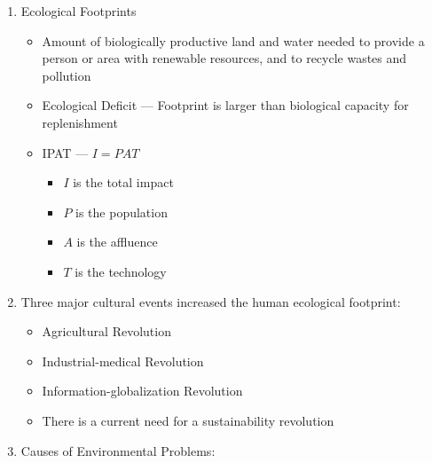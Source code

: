 \documentclass[12pt]{article}
\begin{document}
\begin{enumerate}
\begin{itemize}
    \end{itemize}

  \item Ecological Footprints

    \begin{itemize}

      \item Amount of biologically productive land and water needed to provide a person or area with renewable resources, and to recycle wastes and pollution

      \item Ecological Deficit — Footprint is larger than biological capacity for replenishment

      \item IPAT — $I=PAT$

        \begin{itemize}

          \item $I$ is the total impact

          \item $P$ is the population

          \item $A$ is the affluence

          \item $T$ is the technology

        \end{itemize}

    \end{itemize}

  \item Three major cultural events increased the human ecological footprint:

    \begin{itemize}

      \item Agricultural Revolution

      \item Industrial-medical Revolution

      \item Information-globalization Revolution

      \item There is a current need for a sustainability revolution

    \end{itemize}

  \item Causes of Environmental Problems:


\end{enumerate}
\end{document}
